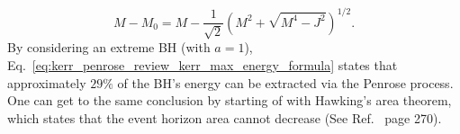%
\begin{equation}
  M - M_0 = M - \frac{1}{\sqrt{2}}\left( M^2 + \sqrt{M^4 - J^2} \right)^{1/2}.
  \label{eq:kerr_penrose_review_kerr_max_energy_formula}
\end{equation}
%
By considering an extreme BH (with $a=1$), Eq.~\eqref{eq:kerr_penrose_review_kerr_max_energy_formula} states that approximately $29\%$ of the BH's energy can be extracted via the Penrose process. One can get to the same conclusion by starting of with Hawking's area theorem, which states that the event horizon area cannot decrease (See Ref.~\cite{carroll} page 270).